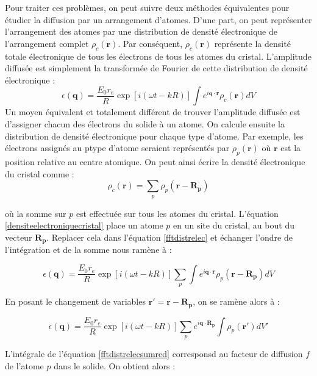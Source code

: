 Pour traiter ces problèmes, on peut suivre deux méthodes équivalentes pour étudier la diffusion par un arrangement d'atomes.
D'une part, on peut représenter l'arrangement des atomes par une distribution de densité électronique de l'arrangement complet $\rho_c(\mathbf{r})$. Par conséquent,
$\rho_c(\mathbf{r})$ représente la densité totale électronique de tous les
électrons de tous les atomes du cristal. L'amplitude diffusée est simplement la
transformée de Fourier de cette distribution de densité électronique :
\begin{equation}
    \epsilon(\mathbf{q}) = \frac{E_0 r_e}{R} \exp [i(\omega t - k R)] \int e^{i \mathbf{q \cdot r}} \rho_c (\mathbf{r}) dV
    \label{fftdistrelec}
\end{equation}
Un moyen équivalent et totalement différent de trouver l'amplitude diffusée est
d'assigner chacun des électrons du solide à un atome. On calcule ensuite la
distribution de densité électronique pour chaque type d'atome. Par exemple, les
électrons assignés au p\ieme type d'atome seraient représentés par
$\rho_p(\mathbf{r})$ où $\mathbf{r}$ est la position relative au centre atomique.
On peut ainsi écrire la densité électronique du cristal comme :
\begin{equation}
    \rho_c(\mathbf{r}) = \sum_p \rho_p(\mathbf{r - R_p})
    \label{densiteelectroniquecristal}
\end{equation}

où la somme sur $p$ est effectuée sur tous les atomes du cristal. L'équation
\ref{densiteelectroniquecristal} place un atome $p$ en un site du cristal, au
bout du vecteur $\mathbf{R_p}$. Replacer cela dans l'équation \ref{fftdistrelec}
et échanger l'ondre de l'intégration et de la somme nous ramène à :

\begin{equation}
   \epsilon(\mathbf{q}) = \frac{E_0 r_e}{R} \exp [i(\omega t - k R)] 
   \sum_p \int e^{i \mathbf{q \cdot r}} \rho_p (\mathbf{r - R_p}) dV
    \label{fftdistrelecsum}
\end{equation}

En posant le changement de variables $\mathbf{r' = r - R_p}$, on se ramène alors
à :

\begin{equation}
    \epsilon(\mathbf{q}) = \frac{E_0 r_e}{R} \exp [i(\omega t - k R)] 
    \sum_p e^{i\mathbf{q \cdot R_p}} \int  \rho_p (\mathbf{r'}) dV'
    \label{fftdistrelecsumred}
\end{equation}

L'intégrale de l'équation \ref{fftdistrelecsumred} corresponsd au facteur de
diffusion $f$ de l'atome $p$ dans le solide. On obtient alors :


